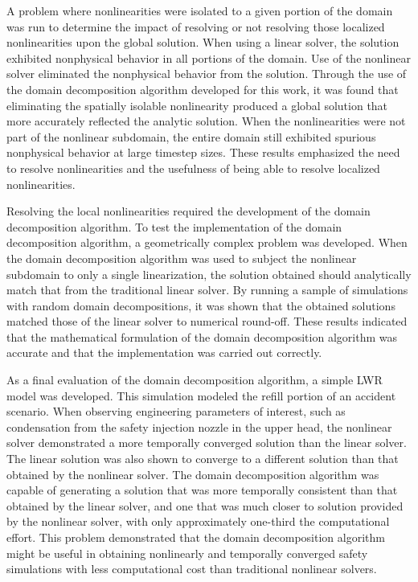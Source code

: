 A problem where nonlinearities were isolated to a given portion of the domain was run to determine the impact of resolving or not resolving those localized nonlinearities upon the global solution.
When using a linear solver, the solution exhibited nonphysical behavior in all portions of the domain.
Use of the nonlinear solver eliminated the nonphysical behavior from the solution.
Through the use of the domain decomposition algorithm developed for this work, it was found that eliminating the spatially isolable nonlinearity produced a global solution that more accurately reflected the analytic solution.
When the nonlinearities were not part of the nonlinear subdomain, the entire domain still exhibited spurious nonphysical behavior at large timestep sizes.
These results emphasized the need to resolve nonlinearities and the usefulness of being able to resolve localized nonlinearities.

Resolving the local nonlinearities required the development of the domain decomposition algorithm. 
To test the implementation of the domain decomposition algorithm, a geometrically complex problem was developed.
When the domain decomposition algorithm was used to subject the nonlinear subdomain to only a single linearization, the solution obtained should analytically match that from the traditional linear solver.
By running a sample of simulations with random domain decompositions, it was shown that the obtained solutions matched those of the linear solver to numerical round-off.
These results indicated that the mathematical formulation of the domain decomposition algorithm was accurate and that the implementation was carried out correctly.

As a final evaluation of the domain decomposition algorithm, a simple LWR model was developed.
This simulation modeled the refill portion of an accident scenario.
When observing engineering parameters of interest, such as condensation from the safety injection nozzle in the upper head, the nonlinear solver demonstrated a more temporally converged solution than the linear solver.
The linear solution was also shown to converge to a different solution than that obtained by the nonlinear solver.
The domain decomposition algorithm was capable of generating a solution that was more temporally consistent than that obtained by the linear solver, and one that was much closer to solution provided by the nonlinear solver, with only approximately one-third the computational effort.
This problem demonstrated that the domain decomposition algorithm might be useful in obtaining nonlinearly and temporally converged safety simulations with less computational cost than traditional nonlinear solvers.

